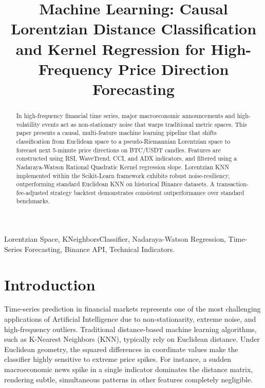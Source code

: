 \documentclass[conference]{IEEEtran}
\begin{document}
\title{Machine Learning: Causal Lorentzian Distance Classification and Kernel Regression for High-Frequency Price Direction Forecasting}

\author{
\and
{}
}

\maketitle

\begin{abstract}
In high-frequency financial time series, major macroeconomic announcements and high-volatility events act as non-stationary noise that warps traditional metric spaces. This paper presents a causal, multi-feature machine learning pipeline that shifts classification from Euclidean space to a pseudo-Riemannian Lorentzian space to forecast next 5-minute price directions on BTC/USDT candles. Features are constructed using RSI, WaveTrend, CCI, and ADX indicators, and filtered using a Nadaraya-Watson Rational Quadratic Kernel regression slope. Lorentzian KNN implemented within the Scikit-Learn framework exhibits robust noise-resiliency, outperforming standard Euclidean KNN on historical Binance datasets. A transaction-fee-adjusted strategy backtest demonstrates consistent outperformance over standard benchmarks.
\end{abstract}

\begin{IEEEkeywords}
Lorentzian Space, KNeighborsClassifier, Nadaraya-Watson Regression, Time-Series Forecasting, Binance API, Technical Indicators.
\end{IEEEkeywords}

\section{Introduction}
Time-series prediction in financial markets represents one of the most challenging applications of Artificial Intelligence due to non-stationarity, extreme noise, and high-frequency outliers. Traditional distance-based machine learning algorithms, such as K-Nearest Neighbors (KNN), typically rely on Euclidean distance. Under Euclidean geometry, the squared differences in coordinate values make the classifier highly sensitive to extreme price spikes. For instance, a sudden macroeconomic news spike in a single indicator dominates the distance matrix, rendering subtle, simultaneous patterns in other features completely negligible.
\end{document}
